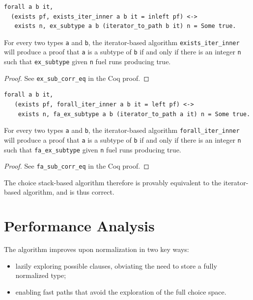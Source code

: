 \documentclass[a4paper,english]{lipics-v2019}
\begin{document}
\begin{lemma}
\begin{small}\begin{verbatim}
forall a b it, 
  (exists pf, exists_iter_inner a b it = inleft pf) <->
   exists n, ex_subtype a b (iterator_to_path b it) n = Some true.
\end{verbatim}\end{small}
For every two types \verb|a| and \verb|b|, the iterator-based algorithm
\verb|exists_iter_inner| will produce a proof that \verb|a| is a subtype
of \verb|b| if and only if there is an integer \verb|n| such that
 \verb|ex_subtype| given \verb|n| fuel runs producing true.
\end{lemma}
\begin{proof}
See \verb|ex_sub_corr_eq| in the Coq proof.
\end{proof}

\begin{lemma}
\begin{small}\begin{verbatim}
forall a b it,
   (exists pf, forall_iter_inner a b it = left pf) <->
    exists n, fa_ex_subtype a b (iterator_to_path a it) n = Some true.
\end{verbatim}
\end{small}  
For every two types \verb|a| and \verb|b|, the iterator-based algorithm
\verb|forall_iter_inner| will produce a proof that \verb|a| is a subtype
of \verb|b| if and only if there is an integer \verb|n| such that
 \verb|fa_ex_subtype| given \verb|n| fuel runs producing true.
\end{lemma}
\begin{proof}
See \verb|fa_sub_corr_eq| in the Coq proof.
\end{proof}

The choice stack-based algorithm therefore is provably equivalent to the
iterator-based algorithm, and is thus correct.

\section{Performance Analysis}

The algorithm improves upon normalization in two key ways:
\begin{itemize}
  \item lazily exploring possible clauses, obviating the need to store a fully normalized type;
  \item enabling fast paths that avoid the exploration of the full choice space.
\end{itemize}
\end{document}
